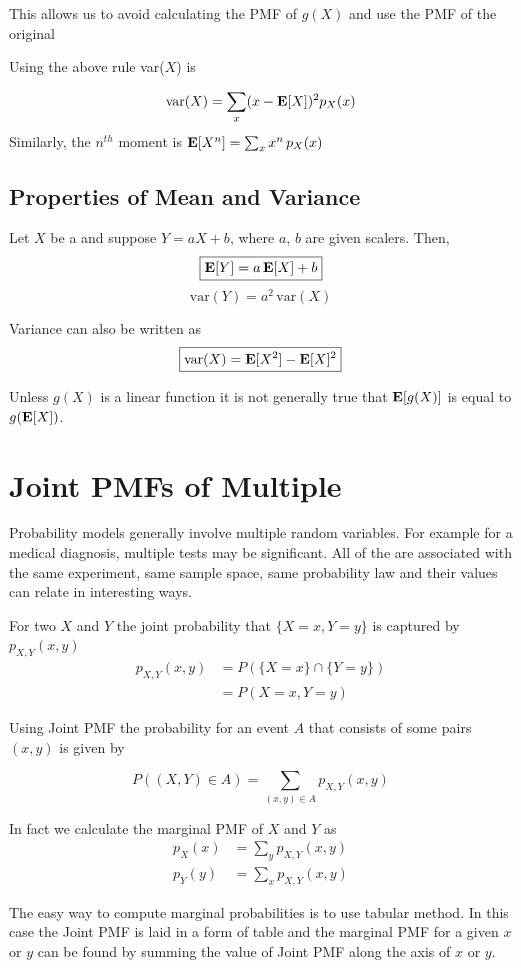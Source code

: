 This allows us to avoid calculating the PMF of $g(X)$ and use the PMF of the original \rv

Using the above rule var($X$) is

\[\text{var}(X) = \sum_x (x-\operatorname{\textbf{E}}[X])^2 p_X(x)\]
Similarly, the $n^{th}$ moment is
$\operatorname{\textbf{E}}[X^n]=\sum_x x^n \, p_X(x)$

\subsection{Properties of Mean and Variance}
Let $X$ be a \rv and suppose $Y=aX+b$, where $a$, $b$ are given scalers. Then,
\[\boxed{\operatorname{\textbf{E}}[Y] = a\operatorname{\textbf{E}}[X]+b}\]
\[\boxed{\text{var}(Y) = a^2 \, \text{var}(X)}\]

Variance can also be written as
\[\boxed{\text{var}(X) = \operatorname{\textbf{E}}[X^2] - \operatorname{\textbf{E}}[X]^2}\]

\begin{remark}
    Unless $g(X)$ is a linear function it is not generally true that $\operatorname{\textbf{E}}[g(X)]$ is equal to $g(\operatorname{\textbf{E}}[X])$.
\end{remark}

\section{Joint PMFs of Multiple \RV}
Probability models generally involve multiple random variables. For example for a medical diagnosis, multiple tests may be significant. All of the \rv are associated with the same experiment, same sample space, same probability law and their values can relate in interesting ways.

For two \rv $X$ and $Y$ the joint probability that $\{X=x, Y=y\}$ is captured by $p_{X,Y}(x,y)$
\begin{align*}
    p_{X,Y}(x,y) &= P(\{X=x\} \cap \{Y=y\}) \\
                 &= P(X=x, Y=y)
\end{align*}

Using Joint PMF the probability for an event $A$ that consists of some pairs $(x,y)$ is given by

\[P((X,Y)\in A) = \sum_{(x,y)\in A}p_{X,Y}(x, y)\]

In fact we calculate the marginal PMF of $X$ and $Y$ as
\begin{align*}
    p_X(x) &= \sum_y p_{X,Y}(x, y) \\
    p_Y(y) &= \sum_x p_{X,Y}(x, y)
\end{align*}

The easy way to compute marginal probabilities is to use tabular method. In this case the Joint PMF is laid in a form of table and the marginal PMF for a given $x$ or $y$ can be found by summing the value of Joint PMF along the axis of $x$ or $y$.

